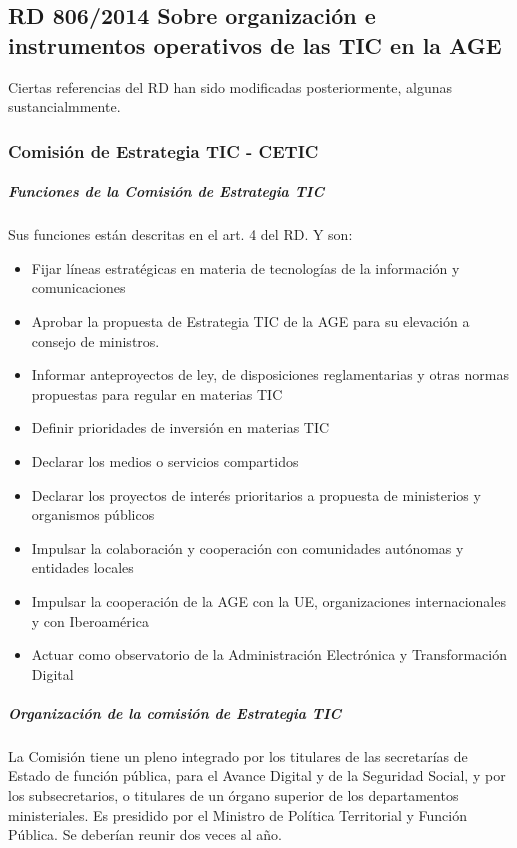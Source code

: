 \subsection{RD 806/2014 Sobre organización e instrumentos operativos de las TIC en la AGE}
    Ciertas referencias del RD han sido modificadas posteriormente, algunas sustancialmmente.

    \subsubsection{Comisión de Estrategia TIC - CETIC}
        \subparagraph{Funciones de la Comisión de Estrategia TIC}
            Sus funciones están descritas en el art. 4 del RD. Y son:
            \begin{itemize}
                \item Fijar líneas estratégicas en materia de tecnologías de la información y comunicaciones
                \item Aprobar la propuesta de Estrategia TIC de la AGE para su elevación a consejo de ministros.
                \item Informar anteproyectos de ley, de disposiciones reglamentarias y otras normas propuestas para regular en materias TIC
                \item Definir prioridades de inversión en materias TIC
                \item Declarar los medios o servicios compartidos
                \item Declarar los proyectos de interés prioritarios a propuesta de ministerios y organismos públicos
                \item Impulsar la colaboración y cooperación con comunidades autónomas y entidades locales
                \item Impulsar la cooperación de la AGE con la UE, organizaciones internacionales y con Iberoamérica
                \item Actuar como observatorio de la Administración Electrónica y Transformación Digital
            \end{itemize}

        \subparagraph{Organización de la comisión de Estrategia TIC}
            La Comisión tiene un pleno integrado por los titulares de las secretarías de Estado de función pública, para el Avance Digital y de la Seguridad Social, y por los subsecretarios, o titulares de un órgano superior de los departamentos ministeriales. Es presidido por el Ministro de Política Territorial y Función Pública. Se deberían reunir dos veces al año.

